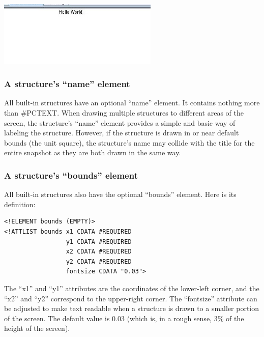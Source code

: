 \documentclass[12pt]{article}
\begin{document}
\begin{center}
  \includegraphics[width=3in]{howto_graphics/helloworld.eps}
\end{center}


\subsubsection{A structure's ``name'' element}


All built-in structures have an optional ``name'' element. It contains
nothing more than \#PCTEXT. When drawing multiple structures to
different areas of the screen, the structure's ``name'' element
provides a simple and basic way of labeling the structure. However, if
the structure is drawn in or near default bounds (the unit square),
the structure's name may collide with the title for the entire
snapshot as they are both drawn in the same way.



\subsubsection{A structure's ``bounds'' element}


All built-in structures also have the optional ``bounds'' element. Here is its definition:

\footnotesize \begin{verbatim}
<!ELEMENT bounds (EMPTY)>
<!ATTLIST bounds x1 CDATA #REQUIRED
                 y1 CDATA #REQUIRED
                 x2 CDATA #REQUIRED
                 y2 CDATA #REQUIRED
                 fontsize CDATA "0.03">
\end{verbatim} \normalsize


                 
The ``x1'' and ``y1'' attributes are the coordinates
of the lower-left corner, and the ``x2'' and ``y2''
correspond to the upper-right corner. The
``fontsize'' attribute can be adjusted to make text
readable when a structure is drawn to a smaller
portion of the screen. The default value is 0.03
(which is, in a rough sense, 3\% of the height of the
screen).
\end{document}
